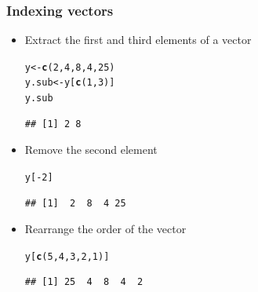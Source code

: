 \documentclass[color=usenames,dvipsnames]{beamer}\usepackage[]{graphicx}\usepackage[]{color}
\makeatletter
\newcommand{\hlnum}[1]{\textcolor[rgb]{0.686,0.059,0.569}{#1}}%
\newcommand{\hlopt}[1]{\textcolor[rgb]{0,0,0}{#1}}%
\newcommand{\hlstd}[1]{\textcolor[rgb]{0.345,0.345,0.345}{#1}}%
\newcommand{\hlkwb}[1]{\textcolor[rgb]{0.69,0.353,0.396}{#1}}%
\newcommand{\hlkwd}[1]{\textcolor[rgb]{0.737,0.353,0.396}{\textbf{#1}}}%
\newenvironment{kframe}{%
 \def\at@end@of@kframe{}%
 \ifinner\ifhmode%
  \def\at@end@of@kframe{\end{minipage}}%
  \begin{minipage}{\columnwidth}%
 \fi\fi%
 \def\FrameCommand##1{\hskip\@totalleftmargin \hskip-\fboxsep
 \colorbox{shadecolor}{##1}\hskip-\fboxsep
     \hskip-\linewidth \hskip-\@totalleftmargin \hskip\columnwidth}%
 \MakeFramed {\advance\hsize-\width
   \@totalleftmargin\z@ \linewidth\hsize
   \@setminipage}}%
 {\par\unskip\endMakeFramed%
 \at@end@of@kframe}
\newenvironment{knitrout}{}{} %
\makeatother
\begin{document}




\begin{frame}[fragile]
  \frametitle{Indexing vectors}
  \begin{itemize}[<+->]
  \item Extract the first and third elements of a vector
\begin{knitrout}
\color{fgcolor}\begin{kframe}
\begin{alltt}
\hlstd{y} \hlkwb{<-} \hlkwd{c}\hlstd{(}\hlnum{2}\hlstd{,} \hlnum{4}\hlstd{,} \hlnum{8}\hlstd{,} \hlnum{4}\hlstd{,} \hlnum{25}\hlstd{)}
\hlstd{y.sub} \hlkwb{<-} \hlstd{y[}\hlkwd{c}\hlstd{(}\hlnum{1}\hlstd{,}\hlnum{3}\hlstd{)]}
\hlstd{y.sub}
\end{alltt}
\begin{verbatim}
## [1] 2 8
\end{verbatim}
\end{kframe}
\end{knitrout}
\item  Remove the second element
\begin{knitrout}
\color{fgcolor}\begin{kframe}
\begin{alltt}
\hlstd{y[}\hlopt{-}\hlnum{2}\hlstd{]}
\end{alltt}
\begin{verbatim}
## [1]  2  8  4 25
\end{verbatim}
\end{kframe}
\end{knitrout}
\item Rearrange the order of the vector
\begin{knitrout}
\color{fgcolor}\begin{kframe}
\begin{alltt}
\hlstd{y[}\hlkwd{c}\hlstd{(}\hlnum{5}\hlstd{,}\hlnum{4}\hlstd{,}\hlnum{3}\hlstd{,}\hlnum{2}\hlstd{,}\hlnum{1}\hlstd{)]}
\end{alltt}
\begin{verbatim}
## [1] 25  4  8  4  2
\end{verbatim}
\end{kframe}
\end{knitrout}
\end{itemize}
\end{frame}
\end{document}
